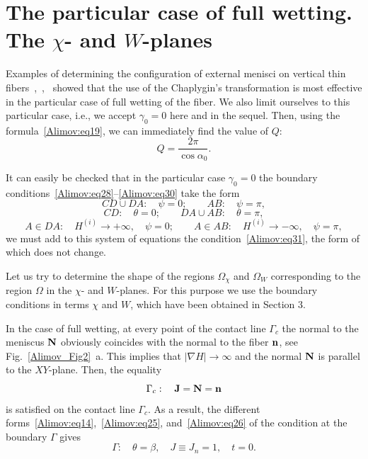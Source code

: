\documentclass[
11pt,%
tightenlines,%
twoside,%
onecolumn,%
nofloats,%
nobibnotes,%
nofootinbib,%
superscriptaddress,%
noshowpacs,%
centertags]%
{revtex4-2}
\begin{document}
\section{The particular case of full wetting. The $\chi$- and $W$-planes} \label{Alimov:sec4}
Examples of determining the configuration of external menisci on vertical thin
fibers~\cite{Alimov:bib5},~\cite{Alimov:bib6},~\cite{Alimov:bib8} showed that the use of the
Chaplygin's transformation is most effective in the particular case of full wetting of the fiber.
We also limit ourselves to this particular case, i.e., we accept $\gamma_0 = 0$ here and in the
sequel. Then, using the formula~\eqref{Alimov:eq19}, we can immediately find the value of $Q$:
\begin{equation}
\label{Alimov:eq32} Q = \frac{2\pi}{\cos \alpha_0 }.
\end{equation}

It can easily be checked that in the particular case $\gamma_0 = 0$ the boundary
conditions~\eqref{Alimov:eq28}--\eqref{Alimov:eq30} take the form
\begin{equation}
\label{Alimov:eq33} CD \cup DA: \quad \psi = 0; \quad \quad AB: \quad \psi = \pi,
\end{equation}
\begin{equation}
\label{Alimov:eq34} CD:\quad \theta = 0; \quad \quad DA \cup AB: \quad \theta = \pi ,
\end{equation}
\begin{equation}
\label{Alimov:eq35} A \in DA: \quad H^{(i)} \to +\infty, \quad \psi = 0; \quad \quad A \in AB:
\quad H^{(i)} \to -\infty, \quad \psi = \pi,
\end{equation}
we must add to this system of equations the condition~\eqref{Alimov:eq31}, the form of
which does not change.

Let us try to determine the shape of the regions $\Omega_\chi $ and $\Omega_W $ corresponding to
the region $\Omega$ in the $\chi$- and $W$-planes. For this purpose we use the boundary conditions
in terms $\chi$ and $W$, which have been obtained in Section 3.

In the case of full wetting, at every point of the contact line $\Gamma_c $ the normal to the
meniscus ${\rm {\bf N}}$ obviously coincides with the normal to the fiber ${\rm {\bf n}}$, see
Fig.~\ref{Alimov_Fig2}~a. This implies that $\vert \nabla H \vert \to \infty $ and the normal ${\rm
{\bf N}}$ is parallel to the $XY$-plane. Then, the equality
\[
\Gamma _c: \quad {\rm {\bf J}} = {\rm {\bf N}} = {\rm {\bf n}}
\]
is satisfied on the contact line $\Gamma_c $. As a result, the different
forms~\eqref{Alimov:eq14},~\eqref{Alimov:eq25}, and~\eqref{Alimov:eq26} of the condition at the
boundary $\Gamma$ gives
\begin{equation}
\label{Alimov:eq36} \Gamma: \quad \theta = \beta, \quad J \equiv J_n = 1, \quad t = 0.
\end{equation}
\end{document}
